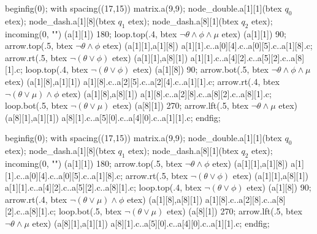     beginfig(0);
        with spacing((17,15)) matrix.a(9,9);
        node_double.a[1][1](btex $q_0$ etex);
        node_dash.a[1][8](btex $q_1$ etex);
        node_dash.a[8][1](btex $q_2$ etex);
        incoming(0, "") (a[1][1]) 180;
        loop.top(.4, btex \small \;$ \neg \theta \wedge \phi \wedge \mu$ etex) (a[1][1]) 90;
        arrow.top(.5, btex \small $ \neg \theta \wedge \phi $ etex) (a[1][1],a[1][8]) a[1][1].c..a[0][4].c..a[0][5].c..a[1][8].c;
        arrow.rt(.5, btex \small $ \neg (\theta \vee \phi)$ etex) (a[1][1],a[8][1]) a[1][1].c..a[4][2].c..a[5][2].c..a[8][1].c;
        loop.top(.4, btex \small \;$ \neg (\theta \vee \phi) $ etex) (a[1][8]) 90;
        arrow.bot(.5, btex \small $ \neg \theta \wedge \phi \wedge \mu $ etex) (a[1][8],a[1][1]) a[1][8].c..a[2][5].c..a[2][4].c..a[1][1].c;
        arrow.rt(.4, btex \small \qquad$ \neg (\theta \vee \mu) \wedge \phi $ etex) (a[1][8],a[8][1]) a[1][8].c..a[2][8].c..a[8][2].c..a[8][1].c;
        loop.bot(.5, btex \small \;$ \neg (\theta \vee \mu) $ etex) (a[8][1]) 270;
        arrow.lft(.5, btex \small $ \neg \theta \wedge \mu $ etex) (a[8][1],a[1][1]) a[8][1].c..a[5][0].c..a[4][0].c..a[1][1].c;
    endfig;
\stopreusableMPgraphic

    beginfig(0);
        with spacing((17,15)) matrix.a(9,9);
        node_double.a[1][1](btex $q_0$ etex);
        node_dash.a[1][8](btex $q_1$ etex);
        node_dash.a[8][1](btex $q_2$ etex);
        incoming(0, "") (a[1][1]) 180;
        arrow.top(.5, btex \small $ \neg \theta \wedge \phi $ etex) (a[1][1],a[1][8]) a[1][1].c..a[0][4].c..a[0][5].c..a[1][8].c;
        arrow.rt(.5, btex \small $ \neg (\theta \vee \phi)$ etex) (a[1][1],a[8][1]) a[1][1].c..a[4][2].c..a[5][2].c..a[8][1].c;
        loop.top(.4, btex \small \;$ \neg (\theta \vee \phi) $ etex) (a[1][8]) 90;
        arrow.rt(.4, btex \small \qquad$ \neg (\theta \vee \mu) \wedge \phi $ etex) (a[1][8],a[8][1]) a[1][8].c..a[2][8].c..a[8][2].c..a[8][1].c;
        loop.bot(.5, btex \small \;$ \neg (\theta \vee \mu) $ etex) (a[8][1]) 270;
        arrow.lft(.5, btex \small $ \neg \theta \wedge \mu $ etex) (a[8][1],a[1][1]) a[8][1].c..a[5][0].c..a[4][0].c..a[1][1].c;
    endfig;
\stopreusableMPgraphic

